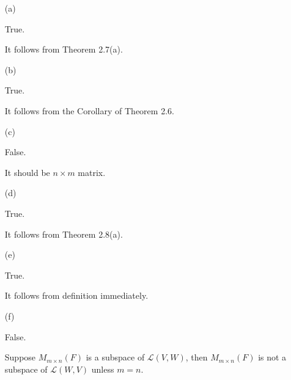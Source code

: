 \begin{Exercise}
	\begin{enumerate}[(a)]
		\item[(a)]
		\begin{answer}
			True.
		\end{answer}
		\begin{solution}
			It follows from Theorem 2.7(a).
		\end{solution}
		
		\item[(b)]
		\begin{answer}
			True.
		\end{answer}
		\begin{solution}
			It follows from the Corollary of Theorem 2.6.
		\end{solution}
		
		\item[(c)]
		\begin{answer}
			False.
		\end{answer}
		\begin{solution}
			It should be $n\times m$ matrix.
		\end{solution}
		
		\item[(d)]
		\begin{answer}
			True.
		\end{answer}
		\begin{solution}
			It follows from Theorem 2.8(a).
		\end{solution}
		
		\item[(e)]
		\begin{answer}
			True.
		\end{answer}
		\begin{solution}
			It follows from definition immediately.
		\end{solution}
		
		\item[(f)]
		\begin{answer}
			False.
		\end{answer}
		\begin{solution}
			Suppose $M_{m\times n}(F)$ is a subspace of $\mathcal{L}(V,W)$, then $M_{m\times n}(F)$ is not a subspace of $\mathcal{L}(W,V)$ unless $m=n$.
		\end{solution}
		
	\end{enumerate}
\end{Exercise}